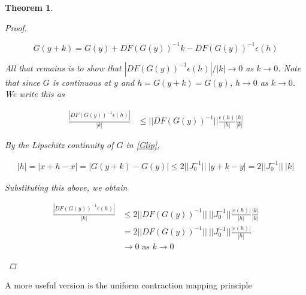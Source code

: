\documentclass{article}
\newtheorem{theorem}{Theorem}[section]
\begin{document}
\begin{theorem}
\begin{proof}
\begin{enumerate}
\[
G(y + k) = G(y) + DF(G(y))^{-1}k - DF(G(y))^{-1}\epsilon(h)
\]

All that remains is to show that $|DF(G(y))^{-1}\epsilon(h)|/|k| \rightarrow 0$ as $k \rightarrow 0$. Note that since $G$ is continuous at $y$ and $h = G(y + k) = G(y)$, $h \rightarrow 0$ as $k \rightarrow 0$. We write this as
 
\begin{align*}
\frac{| DF(G(y))^{-1}\epsilon(h)| }{|k|} 
&\leq || DF(G(y))^{-1}|| \frac{ \epsilon(h)}{|h|}\frac{|h|}{|k|}
\end{align*}

By the Lipschitz continuity of $G$ in \eqref{Glip}, 

\begin{align*}
|h| = |x + h - x| = |G(y + k) - G(y)| \leq 2 ||J_0^{-1}|| \: |y + k - y| = 2 ||J_0^{-1}|| \: |k|
\end{align*}

Substituting this above, we obtain

\begin{align*}
\frac{| DF(G(y))^{-1}\epsilon(h)| }{|k|} 
&\leq 2 ||DF(G(y))^{-1}|| \: ||J_0^{-1}|| \frac{ |\epsilon(h)|}{|h|}\frac{|k|}{|k|} \\
&= 2 ||DF(G(y))^{-1}|| \: ||J_0^{-1}|| \frac{ |\epsilon(h)|}{|h|} \\
&\rightarrow 0 \text{ as }k \rightarrow 0
\end{align*}

\end{enumerate}
\end{proof}
\end{theorem}

A more useful version is the uniform contraction mapping principle
\end{document}
